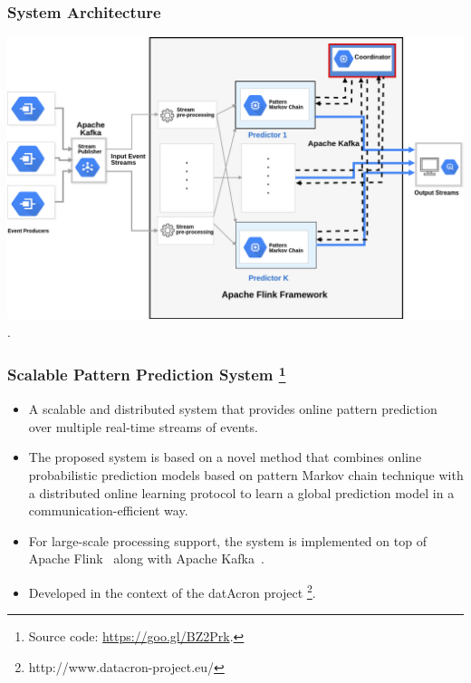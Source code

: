 \frame
{
	\frametitle{System Architecture \\ }
	\begin{center}
	
		\includegraphics[width=\linewidth,left]{../chapters/figures/system.png}	\linebreak\\
	 .
		
	\end{center}
}


\frame
{
	\frametitle{Scalable Pattern Prediction System \footnote{Source code: \url{https://goo.gl/BZ2Prk}.}}
	\begin{itemize}
		
		\item<only@1> A scalable and distributed system that provides online pattern prediction over multiple real-time streams of events.
		\item<only@1> The proposed system is based on a novel method that combines  online probabilistic prediction models based on pattern Markov chain technique \cite{alevizos2017event} with a distributed online learning protocol \cite{kamp2014communication} to learn a global prediction model in a communication-efficient way.
		
		\item<only@1> For large-scale processing support, the system is implemented on top of Apache Flink~\cite{carbone2015apache} along with Apache Kafka~\cite{Kafka}.
		
		\item<only@1> Developed in the context of the datAcron project \footnote{http://www.datacron-project.eu/}.
	\end{itemize}
}